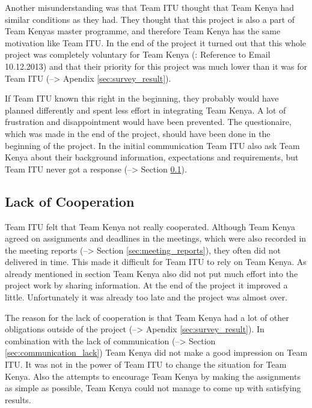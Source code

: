 Another misunderstanding was that Team ITU thought that Team Kenya had similar conditions as they had. They thought that this project is also a part of Team Kenyas master programme, and therefore Team Kenya has the same motivation like Team ITU.
In the end of the project it turned out that this whole project was completely voluntary for Team Kenya (\todo: Reference to Email 10.12.2013) and that their priority for this project was much lower than it was for Team ITU  (--> Apendix \ref{sec:survey_result}).

If Team ITU known this right in the beginning, they probably would have planned differently and spent less effort in integrating Team Kenya. A lot of frustration and disappointment would have been prevented. The questionaire, which was made in the end of the project, should have been done in the beginning of the project. In the initial communication Team ITU also ask Team Kenya about their background information, expectations and requirements, but Team ITU never got a response (--> Section \ref{sec:cooperation_lack}).


\subsection{Lack of Cooperation}
\label{sec:cooperation_lack}
Team ITU felt that Team Kenya not really cooperated. Although Team Kenya agreed on assignments and deadlines in the meetings, which were also recorded in the meeting reports (--> Section \ref{sec:meeting_reports}), they often did not delivered in time. This made it difficult for Team ITU to rely on Team Kenya. As already mentioned in section  Team Kenya also did not put much effort into the project work by sharing information. At the end of the project it improved a little. Unfortunately it was already too late and the project was almost over.

The reason for the lack of cooperation is that Team Kenya had a lot of other obligations outside of the project (--> Apendix \ref{sec:survey_result}). In combination with the lack of communication (--> Section \ref{sec:communication_lack}) Team Kenya did not make a good impression on Team ITU. It was not in the power of Team ITU to change the situation for Team Kenya. Also the attempts to encourage Team Kenya by making the assignments as simple as possible, Team Kenya could not manage to come up with satisfying results.

